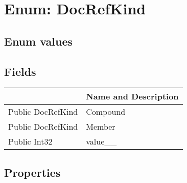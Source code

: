 \documentclass[11pt, oneside, a4paper]{book}
\begin{document}
\section{Enum: DocRefKind}

\subsection{Enum values}

\subsection{Fields}
\begin{center}
\begin{tabular}{| p{3cm} | p{12cm} | }
\hline
\textbf{ } & \textbf{ Name and Description}\\
\hline
 Public  DocRefKind &  Compound\hypertarget{SoftwareEngineeringTools.{}Documentation.{}DocRefKind.{}Compound}{}\\
\hline
 Public  DocRefKind &  Member\hypertarget{SoftwareEngineeringTools.{}Documentation.{}DocRefKind.{}Member}{}\\
\hline
 Public  Int32 &  value\_\_\hypertarget{SoftwareEngineeringTools.{}Documentation.{}DocRefKind.{}value\_\_}{}\\
\hline
\end{tabular}
\end{center}

\subsection{Properties}
\end{document}
